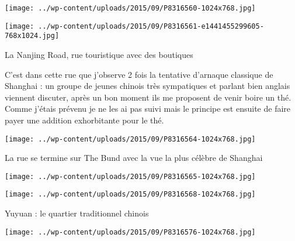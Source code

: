  

 

\begin{center} \texttt{[image: ../wp-content/uploads/2015/09/P8316560-1024x768.jpg]} \end{center}

 

 

\begin{center} \texttt{[image: ../wp-content/uploads/2015/09/P8316561-e1441455299605-768x1024.jpg]} \end{center}

 

 La Nanjing Road, rue touristique avec des boutiques 

 C'est dans cette rue que j'observe 2 fois la tentative d'arnaque classique de Shanghai : un groupe de jeunes chinois très sympatiques et parlant bien anglais viennent discuter, après un bon moment ils me proposent de venir boire un thé. Comme j'étais prévenu je ne les ai pas suivi mais le principe est ensuite de faire payer une addition exhorbitante pour le thé. 

 

\begin{center} \texttt{[image: ../wp-content/uploads/2015/09/P8316564-1024x768.jpg]} \end{center}

 

 La rue se termine sur The Bund avec la vue la plus célèbre de Shanghai 

 

\begin{center} \texttt{[image: ../wp-content/uploads/2015/09/P8316565-1024x768.jpg]} \end{center}

 

 

\begin{center} \texttt{[image: ../wp-content/uploads/2015/09/P8316568-1024x768.jpg]} \end{center}

 

 Yuyuan : le quartier traditionnel chinois 

 

\begin{center} \texttt{[image: ../wp-content/uploads/2015/09/P8316576-1024x768.jpg]} \end{center}

